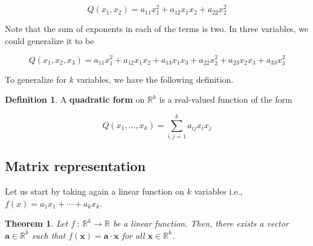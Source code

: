 \documentclass[a4paper,11pt]{article}
\theoremstyle{definition}
\newtheorem{definition}{Definition}
\theoremstyle{plain}
\newtheorem{theorem}{Theorem}
\begin{document}
\[
Q(x_1, x_2) = a_{11}x_1^2 + a_{12}x_1 x_2 + a_{22} x_2^2
\]

Note that the sum of exponents in each of the terms is two. In three
variables, we could generalize it to be

\[
Q(x_1, x_2, x_3) = a_{11}x_1^2 + a_{12}x_1 x_2 + a_{13}x_1 x_3 + a_{22} x_2^2 + a_{23}x_2 x_3 + a_{33} x_3^2
\]

To generalize for \(k\) variables, we have the following definition.

\begin{definition}
A \textbf{quadratic form} on \(\mathbb{R}^k\) is a
real-valued function of the form

\[
Q(x_1, \ldots, x_k) = \sum^k_{i,j = 1} a_{ij}x_i x_j
\]
\end{definition}

\subsection{Matrix representation}\label{matrix-representation}

Let us start by taking again a linear function on \(k\) variables i.e.,
\(f(x) = a_1 x_1 + \cdots + a_k x_k\).

\begin{theorem}
Let \(f \: : \: \mathbb{R}^k \rightarrow \mathbb{R}\) be a linear function. Then, there exists a vector \(\mathbf{a}\in\mathbb{R}^k\) such that \(f(\mathbf{x}) = \mathbf{a}\cdot\mathbf{x}\) for all \(\mathbf{x}\in\mathbb{R}^k\).
\end{theorem}
\end{document}

